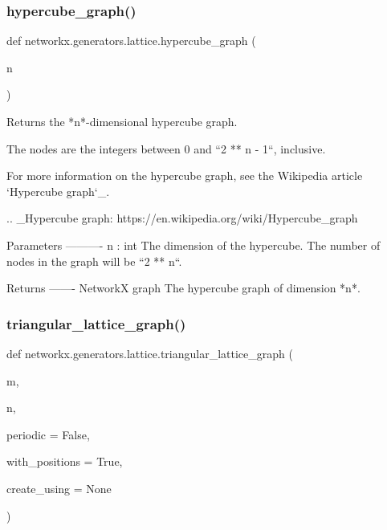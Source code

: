 \subsubsection{\texorpdfstring{hypercube\+\_\+graph()}{hypercube\_graph()}}
{\footnotesize\ttfamily def networkx.\+generators.\+lattice.\+hypercube\+\_\+graph (\begin{DoxyParamCaption}\item[{}]{n }\end{DoxyParamCaption})}

\begin{DoxyVerb}Returns the *n*-dimensional hypercube graph.

The nodes are the integers between 0 and ``2 ** n - 1``, inclusive.

For more information on the hypercube graph, see the Wikipedia
article `Hypercube graph`_.

.. _Hypercube graph: https://en.wikipedia.org/wiki/Hypercube_graph

Parameters
----------
n : int
    The dimension of the hypercube.
    The number of nodes in the graph will be ``2 ** n``.

Returns
-------
NetworkX graph
    The hypercube graph of dimension *n*.
\end{DoxyVerb}
 \mbox{\label{namespacenetworkx_1_1generators_1_1lattice_a5022c00f55ea30c6ae2178224232131f}} 
\subsubsection{\texorpdfstring{triangular\+\_\+lattice\+\_\+graph()}{triangular\_lattice\_graph()}}
{\footnotesize\ttfamily def networkx.\+generators.\+lattice.\+triangular\+\_\+lattice\+\_\+graph (\begin{DoxyParamCaption}\item[{}]{m,  }\item[{}]{n,  }\item[{}]{periodic = {\ttfamily False},  }\item[{}]{with\+\_\+positions = {\ttfamily True},  }\item[{}]{create\+\_\+using = {\ttfamily None} }\end{DoxyParamCaption})}

